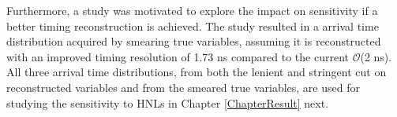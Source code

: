 Furthermore, a study was motivated to explore the impact on sensitivity if a better timing reconstruction is achieved.
The study resulted in a arrival time distribution acquired by smearing true variables, assuming it is reconstructed with an improved timing resolution of 1.73 ns compared to the current $\mathcal{O}$(2 ns).
All three arrival time distributions, from both the lenient and stringent cut on reconstructed variables and from the smeared true variables, are used for studying the sensitivity to HNLs in Chapter \ref{ChapterResult} next. 


